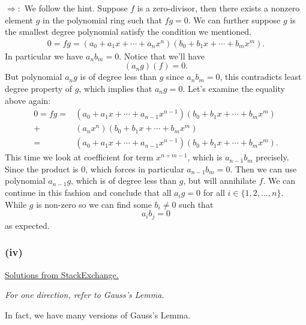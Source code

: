 $\Rightarrow:$ We follow the hint. Suppose $f$ is a zero-divisor, then there exists a nonzero element $g$ in the polynomial ring such that $fg=0$. We can further suppose $g$ is the smallest degree polynomial satisfy the condition we mentioned.
\begin{align*}
    0=fg=(a_0+a_1x+\cdots+a_nx^n)(b_0+b_1x+\cdots+b_mx^m).
\end{align*}In particular we have $a_nb_m=0$. Notice that we'll have 
$$(a_ng)(f)=0.$$ But polynomial $a_ng$ is of degree less than $g$ since $a_nb_m=0$, this contradicts least degree property of $g$, which implies that $a_ng=0$.
Let's examine the equality above again: \begin{align*}
    0=fg=&(a_0+a_1x+\cdots+a_{n-1}x^{n-1})(b_0+b_1x+\cdots+b_mx^m)\\
    +&(a_nx^n)(b_0+b_1x+\cdots+b_mx^m)\\
    =&(a_0+a_1x+\cdots+a_{n-1}x^{n-1})(b_0+b_1x+\cdots+b_mx^m).
\end{align*}This time we look at coefficient for term $x^{n+m-1}$, which is $a_{n-1}b_m$ precisely. Since the product is $0$, which forces in particular $a_{n-1}b_m=0$. Then we can use polynomial $a_{n-1}g$, which is of degree less than $g$, but will annihilate $f$. We can continue in this fashion and conclude that all $a_ig=0$ for all $i\in \{1,2,...,n\}$. While $g$ is non-zero so we can find some $b_i\neq 0$ such that $$a_ib_j=0$$ as expected.

\subsubsection{(iv)}
\href{https://math.stackexchange.com/questions/688331/exercise-from-atiyah-macdonald-chapter-1-2-iv}{Solutions from StackExchange.}

\textit{For one direction, refer to Gauss's Lemma.}

In fact, we have many versions of Gauss's Lemma.



